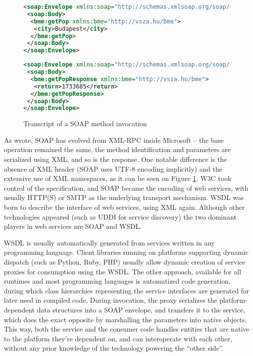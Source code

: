 \begin{figure}[htbp]
 \centering
 \begin{minipage}[t]{0.47\linewidth}
  \centering
  \begin{lstlisting}[language=XML, numbers=off]
<soap:Envelope xmlns:soap="http://schemas.xmlsoap.org/soap/envelope/">
 <soap:Body>
  <bme:getPop xmlns:bme="http://vsza.hu/bme">
   <city>Budapest</city>
  </bme:getPop>
 </soap:Body>
</soap:Envelope>
  \end{lstlisting}
 \end{minipage}
 \hspace{0.5cm}
 \begin{minipage}[t]{0.47\linewidth}
  \centering
  \begin{lstlisting}[language=XML, numbers=off]
<soap:Envelope xmlns:soap="http://schemas.xmlsoap.org/soap/envelope/">
 <soap:Body>
  <bme:getPopResponse xmlns:bme="http://vsza.hu/bme">
   <return>1733685</return>
  </bme:getPopResponse>
 </soap:Body>
</soap:Envelope>
  \end{lstlisting}
 \end{minipage}
 \caption{Transcript of a SOAP method invocation}
 \label{fig:soap-sample}
\end{figure}

As \cite{box_soap_history} wrote, SOAP has evolved from XML-RPC inside Microsoft -- the base operation remained the same, the method identification and parameters are serialized using XML, and so is the response. One notable difference is the absence of XML header (SOAP uses UTF-8 encoding implicitly) and the extensive use of XML namespaces, as it can be seen on Figure \ref{fig:soap-sample}. W3C took control of the specification, and SOAP became the encoding of web services, with usually HTTP(S) or SMTP as the underlying transport mechanism. WSDL was born to describe the interface of web services, using XML again. Although other technologies appeared (such as UDDI for service discovery) the two dominant players in web services are SOAP and WSDL.

WSDL is usually automatically generated from services written in any programming language. Client libraries running on platforms supporting dynamic dispatch (such as Python, Ruby, PHP) usually allow dynamic creation of service proxies for consumption using the WSDL. The other approach, available for all runtimes and most programming languages is automatized code generation, during which class hierarchies representing the service interfaces are generated for later used in compiled code. During invocation, the proxy serializes the platform-dependent data structures into a SOAP envelope, and transfers it to the service, which does the exact opposite by marshalling the parameters into native objects. This way, both the service and the consumer code handles entities that are native to the platform they're dependent on, and can interoperate with each other, without any prior knowledge of the technology powering the ``other side''.

